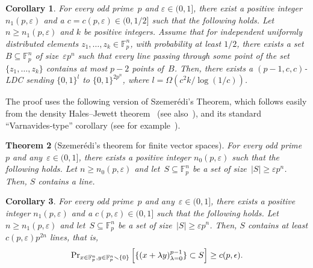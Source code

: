 \documentclass[11pt]{article}
\numberwithin{equation}{section}
\newtheorem{theorem}{Theorem}[section]
\newtheorem{corollary}[theorem]{Corollary}
\theoremstyle{definition}
\theoremstyle{plain}
\newcommand{\bset}[1]{\{0,1\}^{#1}} %
\newcommand{\eps}{\varepsilon}
\newcommand{\F}{{\mathbb{F}}}
\renewcommand{\Pr}{\mbox{\rm Pr}}
\begin{document}
\begin{corollary}\label{cor:lines_ldcs}
For every odd prime~$p$ and $\eps \in (0,1]$, there exist a positive integer $n_1(p,\eps)$ and a $c = c(p,\eps)\in (0,1/2]$ such that the following holds.
Let $n \geq n_1(p,\eps)$ and $k$ be positive integers.
Assume that for independent uniformly distributed elements $z_1,\dots,z_k\in \F_p^n$, with probability at least $1/2$, there exists a set $B\subseteq \F_p^n$ of size~$\eps p^n$ such that
every line %
passing through some point of the set~$\{z_1,\dots,z_k\}$ contains at most $p-2$ points of~$B$.
Then, there exists a $(p-1, c,c)$-LDC sending $\bset{l}$ to $\bset{2p^n}$, where  $l=\Omega(c^2 k/\log(1/c))$.
\end{corollary}

%
The proof uses the following version of Szemer\'edi's Theorem, which follows easily from the density Hales--Jewett theorem~\cite{Furstenberg1991} (see also~\cite[Theorem~1.5.4]{Tao:2012}), and its standard ``Varnavides-type'' corollary (see for example~\cite[Exercise~10.1.9]{Tao:2006}).

\begin{theorem}[Szemer\'edi's theorem for finite vector spaces]\label{thm:szemeredi}
For every odd prime~$p$ and any~$\eps\in (0,1]$, there exists a positive integer $n_0(p,\eps)$ such that the following holds.
Let $n \geq n_0(p,\eps)$ and let~$S \subseteq \F_p^n$ be a set of size~$|S|  \geq \eps p^n$.
Then, $S$ contains a  line. %
\end{theorem}

\begin{corollary}
\label{cor:varnavides}
For every odd prime~$p$ and any~$\eps\in (0,1]$, there exists a positive integer $n_1(p,\eps)$ and a $c(p,\eps)\in(0,1]$ such that the following holds.
Let $n \geq n_1(p,\eps)$ and let~$S \subseteq \F_p^n$ be a set of size~$|S|  \geq \eps p^n$.
Then, $S$ contains at least $c(p,\eps)p^{2n}$  lines, %
that is,
$$\Pr_{x\in \F_p^n, y\in \F_p^n\smallsetminus\{0\}}\left[\{(x+\lambda y)_{\lambda=0}^{p-1}\}\subset S\right]\ge c(p,\epsilon).$$
\end{corollary}
\end{document}
